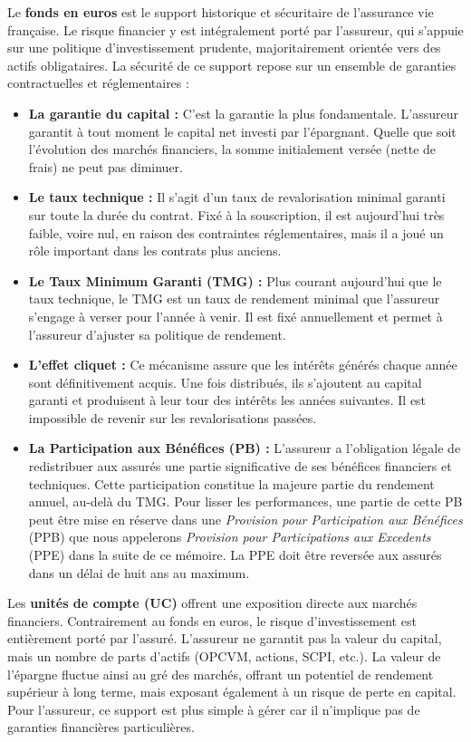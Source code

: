 Le \textbf{fonds en euros} est le support historique et sécuritaire de l'assurance vie française. Le risque financier y est intégralement porté par l'assureur, qui s'appuie sur une politique d'investissement prudente, majoritairement orientée vers des actifs obligataires. La sécurité de ce support repose sur un ensemble de garanties contractuelles et réglementaires :
\begin{itemize}
    \item \textbf{La garantie du capital :} C'est la garantie la plus fondamentale. L'assureur garantit à tout moment le capital net investi par l'épargnant. Quelle que soit l'évolution des marchés financiers, la somme initialement versée (nette de frais) ne peut pas diminuer.
    \item \textbf{Le taux technique :} Il s'agit d'un taux de revalorisation minimal garanti sur toute la durée du contrat. Fixé à la souscription, il est aujourd'hui très faible, voire nul, en raison des contraintes réglementaires, mais il a joué un rôle important dans les contrats plus anciens.
    \item \textbf{Le Taux Minimum Garanti (TMG) :} Plus courant aujourd'hui que le taux technique, le TMG est un taux de rendement minimal que l'assureur s'engage à verser pour l'année à venir. Il est fixé annuellement et permet à l'assureur d'ajuster sa politique de rendement.
    \item \textbf{L'effet cliquet :} Ce mécanisme assure que les intérêts générés chaque année sont définitivement acquis. Une fois distribués, ils s'ajoutent au capital garanti et produisent à leur tour des intérêts les années suivantes. Il est impossible de revenir sur les revalorisations passées.
    \item \textbf{La Participation aux Bénéfices (PB) :} L'assureur a l'obligation légale de redistribuer aux assurés une partie significative de ses bénéfices financiers et techniques. Cette participation constitue la majeure partie du rendement annuel, au-delà du TMG. Pour lisser les performances, une partie de cette PB peut être mise en réserve dans une \textit{Provision pour Participation aux Bénéfices} (PPB) que nous appelerons \textit{Provision pour Participations aux Excedents} (PPE) dans la suite de ce mémoire. La PPE doit être reversée aux assurés dans un délai de huit ans au maximum.
\end{itemize}


Les \textbf{unités de compte (UC)} offrent une exposition directe aux marchés financiers. Contrairement au fonds en euros, le risque d'investissement est entièrement porté par l'assuré. L'assureur ne garantit pas la valeur du capital, mais un nombre de parts d'actifs (OPCVM, actions, SCPI, etc.). La valeur de l'épargne fluctue ainsi au gré des marchés, offrant un potentiel de rendement supérieur à long terme, mais exposant également à un risque de perte en capital. Pour l'assureur, ce support est plus simple à gérer car il n'implique pas de garanties financières particulières.


